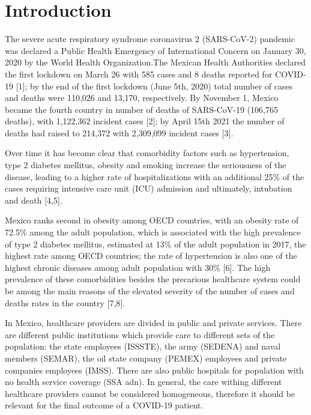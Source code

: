 \documentclass[10pt,letterpaper]{article}
\begin{document}
\hypertarget{introduction}{%
\section{Introduction}\label{introduction}}

The severe acute respiratory syndrome coronavirus 2 (SARS-CoV-2)
pandemic was declared a Public Health Emergency of International Concern
on January 30, 2020 by the World Health Organization.The Mexican Health
Authorities declared the first lockdown on March 26 with 585 cases and 8
deaths reported for COVID-19 {[}1{]}; by the end of the first lockdown
(June 5th, 2020) total number of cases and deaths were 110,026 and
13,170, respectively. By November 1, Mexico became the fourth country in
number of deaths of SARS-CoV-19 (106,765 deaths), with 1,122,362
incident cases {[}2{]}; by April 15th 2021 the number of deaths had
raised to 214,372 with 2,309,099 incident cases {[}3{]}.

Over time it has become clear that comorbidity factors such as
hypertension, type 2 diabetes mellitus, obesity and smoking increase the
seriousness of the disease, leading to a higher rate of hospitalizations
with an additional 25\% of the cases requiring intensive care unit (ICU)
admission and ultimately, intubation and death {[}4,5{]}.

Mexico ranks second in obesity among OECD countries, with an obesity
rate of 72.5\% among the adult population, which is associated with the
high prevalence of type 2 diabetes mellitus, estimated at 13\% of the
adult population in 2017, the highest rate among OECD countries; the
rate of hypertension is also one of the highest chronic diseases among
adult population with 30\% {[}6{]}. The high prevalence of these
comorbidities besides the precarious healthcare system could be among
the main reasons of the elevated severity of the number of cases and
deaths rates in the country {[}7,8{]}.

In Mexico, healthcare providers are divided in public and private
services. There are different public institutions which provide care to
different sets of the population: the state employees (ISSSTE), the army
(SEDENA) and naval members (SEMAR), the oil state company (PEMEX)
employees and private companies employees (IMSS). There are also public
hospitals for population with no health service coverage (SSA adn). In
general, the care withing different healthcare providers cannot be
considered homogeneous, therefore it should be relevant for the final
outcome of a COVID-19 patient.
\end{document}
